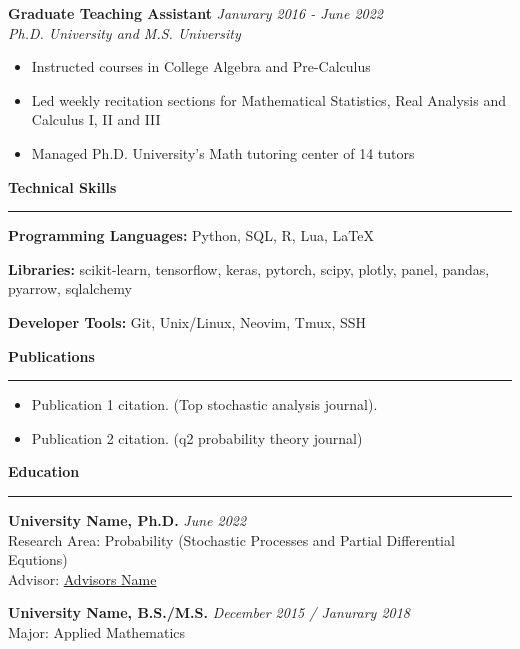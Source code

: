 \documentclass[11pt]{article}
\begin{document}
\textbf{\large Graduate Teaching Assistant}  \hfill \textit{Janurary 2016 - June 2022} \\
\textit{Ph.D. University and M.S. University}
\begin{itemize} \setlength\itemsep{-0.5em}
  \item  Instructed courses in College Algebra and Pre-Calculus
  \item  Led weekly recitation sections for Mathematical Statistics, Real Analysis
  and Calculus I, II and III
  \item Managed Ph.D. University's Math tutoring center of 14 tutors
\end{itemize}

\vspace{.3em}
\textbf{\Large Technical Skills}
\vspace{.3em}
\hrule
\vspace{.3em}

\textbf{Programming Languages:}
Python, SQL, R, Lua, \LaTeX

\textbf{Libraries:} scikit-learn, tensorflow, keras, pytorch, scipy, plotly, panel, 
pandas, pyarrow, sqlalchemy 

\textbf{Developer Tools:} Git, Unix/Linux, Neovim, Tmux, SSH

\vspace{.3em}
\textbf{\Large Publications}
\vspace{.3em}
\hrule
\vspace{.3em}

\begin{itemize}[leftmargin=*]
  \item[1:] Publication 1 citation. (Top stochastic analysis journal).

  \item[2:] Publication 2 citation. (q2 probability theory journal)\\
\end{itemize}

\vspace{.3em}
\textbf{\Large Education}
\vspace{.3em}
\hrule
\vspace{.3em}


\textbf{University Name, Ph.D.} \hfill \textit{June 2022} \\
Research Area: Probability (Stochastic Processes and Partial Differential Equtions) \\
Advisor: \href{http://advisor.web.page}{Advisors Name}

\textbf{University Name, B.S./M.S.} \hfill \textit{December 2015 / Janurary 2018} \\
Major: Applied Mathematics \\
\end{document}
